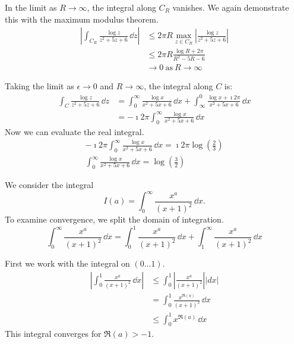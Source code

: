 {\begin{Solution}
  In the limit as $R \to \infty$, the integral along $C_R$ vanishes.
  We again demonstrate this with the maximum modulus theorem.
  \begin{align*}
    \left| \int_{C_R} \frac{ \log z }{ z^2 + 5 z + 6 }\,\dd  z \right|
    &\leq 2 \pi R \max_{z \in C_R} 
    \left| \frac{ \log z }{ z^2 + 5 z + 6 } \right| \\
    &\leq 2 \pi R \frac{ \log R + 2 \pi }
    { R^2 - 5 R - 6 } \\
    &\to 0\ \mathrm{as}\ R \to \infty
  \end{align*}

  Taking the limit as $\epsilon \to 0$ and $R \to \infty$, the integral
  along $C$ is:
  \begin{align*}
    \int_C \frac{ \log z }{ z^2 + 5 z + 6 } \,\dd z
    &= \int_0^\infty \frac{ \log x }{ x^2 + 5 x + 6 } \,\dd x
    + \int_{\infty}^0 \frac{ \log x + \imath 2 \pi }{ x^2 + 5 x + 6 } \,\dd x \\
    &= -\imath 2 \pi \int_0^\infty \frac{ \log x }{ x^2 + 5 x + 6 } \,\dd x
  \end{align*}
  Now we can evaluate the real integral.
  \begin{gather*}
    -\imath 2 \pi \int_0^\infty \frac{ \log x }{ x^2 + 5 x + 6 } \,\dd x
    = \imath 2 \pi \log \left( \frac{2}{3} \right) \\
    \boxed{
      \int_0^\infty \frac{ \log x }{ x^2 + 5 x + 6 } \,\dd x
      = \log \left( \frac{3}{2} \right)
      }
  \end{gather*}
\end{Solution}







\begin{Solution}
  \label{solution x^a/(x+1)^2}
  We consider the integral
  \[
  I(a) = \int_0^\infty \frac{x^a}{(x+1)^2}\,\dd x.
  \]
  To examine convergence, we split the domain of integration.
  \[
  \int_0^\infty \frac{x^a}{(x+1)^2}\,\dd x
  = \int_0^1 \frac{x^a}{(x+1)^2}\,\dd x
  + \int_1^\infty \frac{x^a}{(x+1)^2}\,\dd x
  \]

  First we work with the integral on $(0 \ldots 1)$.
  \begin{align*}
    \left| \int_0^1 \frac{x^a}{(x+1)^2}\,\dd x \right|
    &\leq \int_0^1 \left| \frac{x^a}{(x+1)^2} \right| 
     \left| d x \right| \\
    &= \int_0^1 \frac{x^{\Re(a)}}{(x+1)^2} \,\dd x \\
    &\leq \int_0^1 x^{\Re(a)} \,\dd x
  \end{align*}
  This integral converges for $\Re(a) > -1$.


\end{Solution}}
